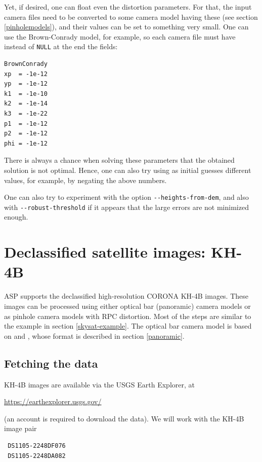 Yet, if desired, one can float even the distortion parameters. 
For that, the input camera files need to be converted
to some camera model having these (see section \ref{pinholemodels}), 
and their values can be set to something very small.
One can use the Brown-Conrady model, for example, so each camera file must have
instead of \texttt{NULL} at the end the fields:
\begin{verbatim}
BrownConrady
xp  = -1e-12
yp  = -1e-12
k1  = -1e-10
k2  = -1e-14
k3  = -1e-22
p1  = -1e-12
p2  = -1e-12
phi = -1e-12
\end{verbatim}

There is always a chance when solving these parameters that the obtained solution is not optimal.
Hence, one can also try using as initial guesses different values, for example, 
by negating the above numbers. 

One can also try to experiment with the option \texttt{-\/-heights-from-dem}, and also with \texttt{-\/-robust-threshold} if it appears that the large errors are not minimized enough.

\section{Declassified satellite images: KH-4B}
\label{kh4}

ASP supports the declassified high-resolution CORONA KH-4B images.
These images can be processed using either optical bar (panoramic)
camera models or as pinhole camera models with RPC distortion.
Most of the steps are similar to the example in section \ref{skysat-example}.
The optical bar camera model is based on \cite{schenk2003rigorous} and
\cite{sohn2004mathematical}, whose format is described in section
\ref{panoramic}.

\subsection{Fetching the data}

KH-4B images are available via the USGS Earth Explorer, at
\begin{center}
 \url{https://earthexplorer.usgs.gov/}
\end{center}

(an account is required to download the data). We will work with the KH-4B image pair

\begin{verbatim}
 DS1105-2248DF076
 DS1105-2248DA082
\end{verbatim}

